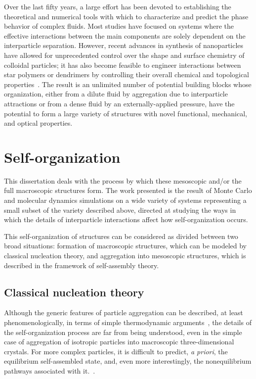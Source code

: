 Over the last fifty years, a large effort has been devoted to establishing the theoretical and numerical tools with which to characterize and predict the phase behavior of complex fluids.
Most studies have focused on systems where the effective interactions between the main components are solely dependent on the interparticle separation.
However, recent advances in synthesis of nanoparticles~\cite{DeVries,Schnablegger,Hong,Weller,Hobbie,weitz,pine,mitragotri} have allowed for unprecedented control over the  shape and surface chemistry of colloidal particles;
it has also become feasible to engineer interactions between star polymers or dendrimers by controlling their overall chemical and topological properties~\cite{mladek}.
The result is an unlimited number of potential building blocks whose organization, either from a dilute fluid by aggregation due to interparticle attractions or from a dense fluid by an externally-applied pressure, have the potential to form a large variety of structures with novel functional, mechanical, and optical properties.

\section{Self-organization}

This dissertation deals with the process by which these mesoscopic and/or the full macroscopic structures form.
The work presented is the result of Monte Carlo and molecular dynamics simulations on a wide variety of systems representing a small subset of the variety described above, directed at studying the ways in which the details of interparticle interactions affect how self-organization occurs.

This self-organization of structures can be considered as divided between two broad situations: formation of macroscopic structures, which can be modeled by classical nucleation theory, and aggregation into mesoscopic structures, which is described in the framework of self-assembly theory.

\subsection{Classical nucleation theory}\label{sec:CNT}

Although the generic features of particle aggregation can be described, at least phenomenologically, in terms of simple thermodynamic arguments~\cite{Israelachvili, Zhang, Leckband, Nagarajan, glotzer2}, the details of the self-organization process are far from being understood, even in the simple case of aggregation of isotropic particles into macroscopic three-dimensional crystals.
For more complex particles, it is difficult to predict, \textit{a priori}, the equilibrium self-assembled state, and, even more interestingly, the nonequilibrium pathways associated with it.~\cite{Hong2}.

